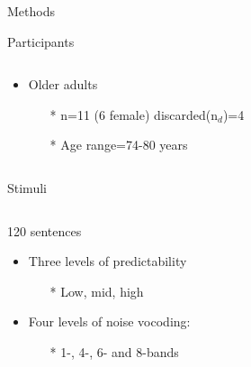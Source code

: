 \documentclass[final,12pt]{beamer}
\begin{document}
\begin{frame}[t]
\begin{columns}[t]
\begin{block}{Methods}
\begin{greenbox}{Participants}
\begin{columns}
                    \begin{column}{.48\linewidth}
                        \begin{itemize}
                            \item Older adults
                                \begin{itemize}
                                    \item[\tiny{*}] \small n=11 (6 female)
                                    \tiny{discarded(n$_{d}$)=4}
                                    \item[\tiny{*}] \small Age range=74-80 years
                                \end{itemize}
                        \end{itemize}
                    \end{column}
             
                \end{columns}                
            \end{greenbox}
        \vspace{0.3em}
            \begin{greenbox}{Stimuli}
                \begin{columns}
                    \begin{column}{.48\linewidth}
                     \small {120 sentences
                        \begin{itemize}
                            \item Three levels of predictability
                                \begin{itemize}
                                    \item[\tiny{*}]Low, mid, high
                                \end{itemize}
                            \item Four levels of noise vocoding:
                                \begin{itemize}
                                    \item[\tiny{*}]1-, 4-, 6- and 8-bands
                                    \end{itemize}
                        \end{itemize}}                    
                    \end{column}
                        

\end{columns}
\end{greenbox}
\end{block}
\end{columns}
\end{frame}
\end{document}

